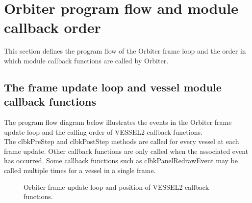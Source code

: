 \documentclass[Orbiter Developer Manual.tex]{subfiles}
\begin{document}
\section{Orbiter program flow and module callback order}
This section defines the program flow of the Orbiter frame loop and the order in which module callback functions are called by Orbiter.


\subsection{The frame update loop and vessel module callback functions}

The program flow diagram below illustrates the events in the Orbiter frame update loop and the calling order of VESSEL2 callback functions.\\
The clbkPreStep and clbkPostStep methods are called for every vessel at each frame update. Other callback functions are only called when the associated event has occurred. Some callback functions such as clbkPanelRedrawEvent may be called multiple times for a vessel in a single frame.

\begin{figure}[H]
	\centering
	\caption{Orbiter frame update loop and position of VESSEL2 callback functions.}
\end{figure}
\end{document}
